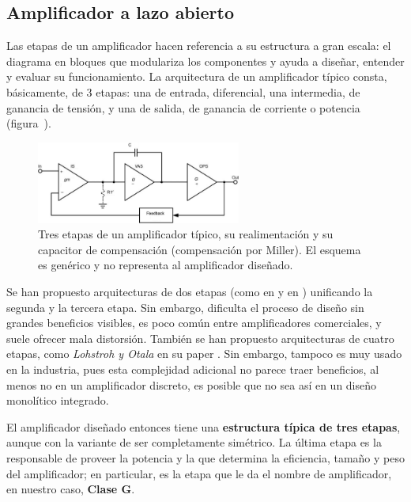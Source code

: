\subsection{Amplificador a lazo abierto}

Las etapas de un amplificador hacen referencia a su estructura a gran escala: el diagrama en bloques que modulariza los componentes y ayuda a diseñar, entender y evaluar su funcionamiento. La arquitectura de un amplificador típico consta, básicamente, de 3 etapas: una de entrada, diferencial, una intermedia, de ganancia de tensión, y una de salida, de ganancia de corriente o potencia (figura~).

\begin{figure}[H]
	\centering
	\includegraphics[width=0.6\textwidth]{img/etapas}
	\caption{Tres etapas de un amplificador típico, su realimentación y su capacitor de compensación (compensación por Miller). El esquema es genérico y no representa al amplificador diseñado.}
	\label{fig:etapas}
\end{figure}


Se han propuesto arquitecturas de dos etapas (como en \textbf{} y en \textbf{}) unificando la segunda y la tercera etapa. Sin embargo, dificulta el proceso de diseño sin grandes beneficios visibles, es poco común entre amplificadores comerciales, y suele ofrecer mala distorsión. También se han propuesto arquitecturas de cuatro etapas, como \textit{Lohstroh y Otala} en su paper \textbf{}. Sin embargo, tampoco es muy usado en la industria, pues esta complejidad adicional no parece traer beneficios, al menos no en un amplificador discreto, es posible que no sea así en un diseño monolítico integrado.


El amplificador diseñado entonces tiene una \textbf{estructura típica de tres etapas}, aunque con la variante de ser completamente simétrico. La última etapa es la responsable de proveer la potencia y la que determina la eficiencia, tamaño y peso del amplificador; en particular, es la etapa que le da el nombre de amplificador, en nuestro caso, \textbf{Clase G}.


